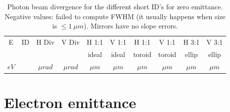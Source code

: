 \documentclass[a4paper,10pt]{article}
\begin{document}
\begin{table}[H]
\label{tabledivergenceszeroemittance}
\caption{Photon beam divergence for the different short ID's for zero emittance. 
Negative values: failed to compute FWHM (it usually happens when size is $\leq 1~\mu m$).
Mirrors have no slope errors. }
\vspace{0.3cm}
\begin{tabular}{cc|cc|cc|cc|cc}      %
\hline
E       & ID  & H Div     &  V Div     & H 1:1            &  V 1:1   & H 1:1    &  V 1:1   & H 3:1     &  V 3:1      \\
        &     &           &            & ideal            &  ideal   & toroid   &  toroid  & ellip     &  ellip  \\
$eV$    &     & $\mu rad$ &  $\mu rad$ & $\mu m$          &  $\mu m$ & $\mu m$  &  $\mu m$ & $\mu m$   &  $\mu m$\\
\hline

\hline
\end{tabular}
\end{table}

\section{Electron emittance}
\end{document}
